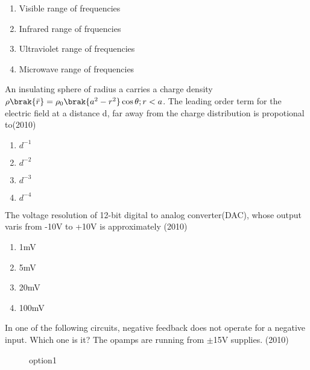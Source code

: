     \begin{enumerate}[label=(\Alph*)]
        \item Visible range of frequencies 
        \item Infrared range of frquencies 
        \item Ultraviolet range of frequencies
        \item Microwave range of frequencies
    \end{enumerate}
    \item An insulating sphere of radius a carries a charge density $\rho \brak{\bar{r}}=\rho_0\brak{a^2-r^2}\cos\theta; r<a$. The leading order term for the electric field at a distance d, far away from the charge distribution is propotional to\hfill (2010)
    \begin{enumerate}[label=(\Alph*)]
        \item $d^{-1}$
        \item $d^{-2}$
        \item $d^{-3}$
        \item $d^{-4}$
    \end{enumerate}
    \item The voltage resolution of 12-bit digital to analog converter(DAC), whose output varis from -10V to +10V is approximately  \hfill (2010)
    \begin{enumerate}[label=(\Alph*)]
        \item 1mV
        \item 5mV
        \item 20mV
        \item 100mV
    \end{enumerate}
    \item In one of the following circuits, negative feedback does not operate for a negative input. Which one is it? The opamps are running from $\pm$15V supplies. \hfill (2010)
    \begin{figure}[!ht]
        \centering
        \caption{option1}
    \end{figure}

